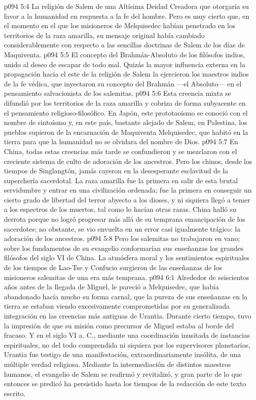 \vs p094 5:4 La religión de Salem de una Altísima Deidad Creadora que otorgaría su favor a la humanidad en respuesta a la fe del hombre. Pero es muy cierto que, en el momento en el que los misioneros de Melquisedec habían penetrado en los territorios de la raza amarilla, su mensaje original había cambiado considerablemente con respecto a las sencillas doctrinas de Salem de los días de Maquiventa.
\vs p094 5:5 El concepto del Brahmán\hyp{}Absoluto de los filósofos indios, unido al deseo de escapar de todo mal. Quizás la mayor influencia externa en la propagación hacia el este de la religión de Salem la ejercieron los maestros indios de la fe védica, que inyectaron su concepto del Brahmán ---el Absoluto--- en el pensamiento salvacionista de los salemitas.
\vs p094 5:6 \pc Esta creencia mixta se difundió por los territorios de la raza amarilla y cobriza de forma subyacente en el pensamiento religioso\hyp{}filosófico. En Japón, este prototaoísmo se conoció con el nombre de sintoísmo y, en este país, bastante alejado de Salem, en Palestina, los pueblos supieron de la encarnación de Maquiventa Melquisedec, que habitó en la tierra para que la humanidad no se olvidara del nombre de Dios.
\vs p094 5:7 En China, todas estas creencias más tarde se confundieron y se mezclaron con el creciente sistema de culto de adoración de los ancestros. Pero los chinos, desde los tiempos de Singlangtón, jamás cayeron en la desesperante esclavitud de la superchería sacerdotal. La raza amarilla fue la primera en salir de esta brutal servidumbre y entrar en una civilización ordenada; fue la primera en conseguir un cierto grado de libertad del terror abyecto a los dioses, y ni siquiera llegó a temer a los espectros de los muertos, tal como lo hacían otras razas. China halló su derrota porque no logró progresar más allá de su temprana emancipación de los sacerdotes; no obstante, se vio envuelta en un error casi igualmente trágico: la adoración de los ancestros.
\vs p094 5:8 \pc Pero los salemitas no trabajaron en vano; sobre los fundamentos de su evangelio conformarían sus enseñanzas los grandes filósofos del siglo VI de China. La atmósfera moral y los sentimientos espirituales de los tiempos de Lao\hyp{}Tse y Confucio surgieron de las enseñanzas de los misioneros salemitas de una era más temprana.
\vs p094 6:1 Alrededor de seiscientos años antes de la llegada de Miguel, le pareció a Melquisedec, que había abandonado hacía mucho su forma carnal, que la pureza de sus enseñanzas en la tierra se estaban viendo excesivamente comprometidas por su generalizada integración en las creencias más antiguas de Urantia. Durante cierto tiempo, tuvo la impresión de que su misión como precursor de Miguel estaba al borde del fracaso. Y en el siglo VI a. C., mediante una coordinación inusitada de instancias espirituales, no del todo comprendida ni siquiera por los supervisores planetarios, Urantia fue testigo de una manifestación, extraordinariamente insólita, de una múltiple verdad religiosa. Mediante la intermediación de distintos maestros humanos, el evangelio de Salem se reafirmó y revitalizó, y gran parte de lo que entonces se predicó ha persistido hasta los tiempos de la redacción de este texto escrito.
